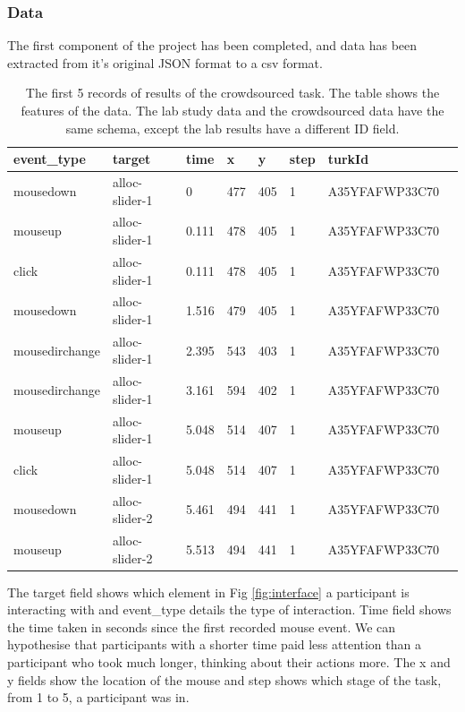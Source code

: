 \documentclass{article}
\begin{document}

\subsubsection{Data}



The first component of the project has been completed, and data has been extracted from it's original JSON format to a csv format.

\begin{table}[ht]
    \caption{\label{table:data} The first 5 records of results of the crowdsourced task.
        The table shows the features of the data.
        The lab study data and the crowdsourced data have the same schema, except the lab results have a different ID field.
    }
    \begin{tabular}{llllllll}
        \hline
        event\_type    & target         & time  & x   & y   & step & turkId         \\ \hline
        mousedown      & alloc-slider-1 & 0     & 477 & 405 & 1    & A35YFAFWP33C70 \\
        mouseup        & alloc-slider-1 & 0.111 & 478 & 405 & 1    & A35YFAFWP33C70 \\
        click          & alloc-slider-1 & 0.111 & 478 & 405 & 1    & A35YFAFWP33C70 \\
        mousedown      & alloc-slider-1 & 1.516 & 479 & 405 & 1    & A35YFAFWP33C70 \\
        mousedirchange & alloc-slider-1 & 2.395 & 543 & 403 & 1    & A35YFAFWP33C70 \\
        mousedirchange & alloc-slider-1 & 3.161 & 594 & 402 & 1    & A35YFAFWP33C70 \\
        mouseup        & alloc-slider-1 & 5.048 & 514 & 407 & 1    & A35YFAFWP33C70 \\
        click          & alloc-slider-1 & 5.048 & 514 & 407 & 1    & A35YFAFWP33C70 \\
        mousedown      & alloc-slider-2 & 5.461 & 494 & 441 & 1    & A35YFAFWP33C70 \\
        mouseup        & alloc-slider-2 & 5.513 & 494 & 441 & 1    & A35YFAFWP33C70 \\ \hline
    \end{tabular}
\end{table}

The target field shows which element in Fig \ref{fig:interface} a participant is interacting with and event\_type details the type of interaction.
Time field shows the time taken in seconds since the first recorded mouse event.
We can hypothesise that participants with a shorter time paid less attention than a participant who took much longer, thinking about their actions more.
The x and y fields show the location of the mouse and step shows which stage of the task, from 1 to 5, a participant was in.
\end{document}
